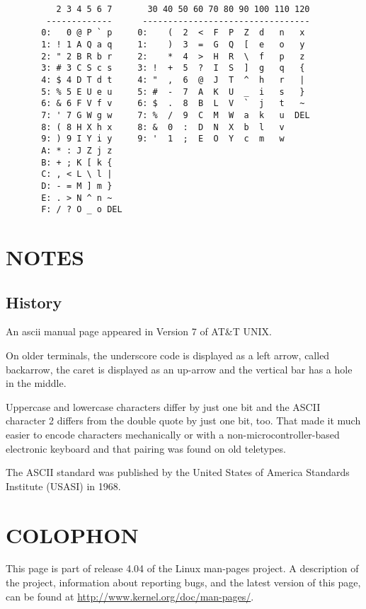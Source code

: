\begin{verbatim}
          2 3 4 5 6 7       30 40 50 60 70 80 90 100 110 120
        -------------      ---------------------------------
       0:   0 @ P ` p     0:    (  2  <  F  P  Z  d   n   x
       1: ! 1 A Q a q     1:    )  3  =  G  Q  [  e   o   y
       2: " 2 B R b r     2:    *  4  >  H  R  \  f   p   z
       3: # 3 C S c s     3: !  +  5  ?  I  S  ]  g   q   {
       4: $ 4 D T d t     4: "  ,  6  @  J  T  ^  h   r   |
       5: % 5 E U e u     5: #  -  7  A  K  U  _  i   s   }
       6: & 6 F V f v     6: $  .  8  B  L  V  `  j   t   ~
       7: ' 7 G W g w     7: %  /  9  C  M  W  a  k   u  DEL
       8: ( 8 H X h x     8: &  0  :  D  N  X  b  l   v
       9: ) 9 I Y i y     9: '  1  ;  E  O  Y  c  m   w
       A: * : J Z j z
       B: + ; K [ k {
       C: , < L \ l |
       D: - = M ] m }
       E: . > N ^ n ~
       F: / ? O _ o DEL
\end{verbatim}

\section{NOTES}
\subsection{History}

       An ascii manual page appeared in Version 7 of AT\&T UNIX.

       On older terminals, the underscore code is displayed as a  left  arrow,
       called  backarrow, the caret is displayed as an up-arrow and the 
vertical bar has a hole in the middle.

       Uppercase and lowercase characters differ by just one bit and the ASCII
       character  2  differs from the double quote by just one bit, too.  That
       made it much easier to encode characters mechanically or  with  a  
non-microcontroller-based electronic keyboard and that pairing was found on
       old teletypes.

       The ASCII standard was published by the United States of America  
Standards Institute (USASI) in 1968.

\section{COLOPHON}

       This page is part of release 4.04 of the Linux  man-pages  project.   A
       description  of  the project, information about reporting bugs, and the
       latest    version    of    this    page,    can     be     found     at
       \url{http://www.kernel.org/doc/man-pages/}.
